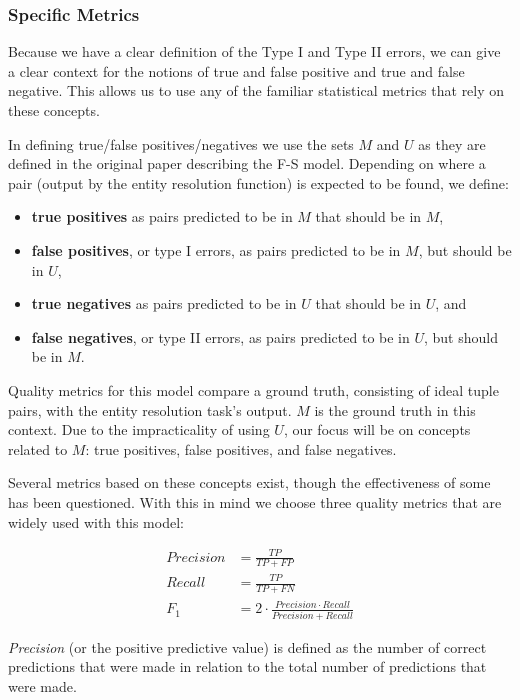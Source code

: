 \subsubsection[fsm-metrics]{Specific Metrics}\label{subsubsec:fsm-metrics}

Because we have a clear definition of the Type I and Type II errors, we can
give a clear context for the notions of true and false positive and true and
false negative.
This allows us to use any of the familiar statistical metrics that rely on
these concepts.

In defining true/false positives/negatives we use the sets $M$ and $U$ as
they are defined in the original paper describing the F-S model.
Depending on where a pair (output by the entity resolution function) is
expected to be found, we define:

\begin{itemize}
    \item \textbf{true positives} as pairs predicted to be in $M$ that
    should be in $M$,
    \item \textbf{false positives}, or type I errors, as pairs predicted to
    be in $M$, but should be in $U$,
    \item \textbf{true negatives} as pairs predicted to be in $U$ that
    should be in $U$, and
    \item \textbf{false negatives}, or type II errors, as pairs predicted to
    be in $U$, but should be in $M$.
\end{itemize}

Quality metrics for this model compare a ground truth, consisting of ideal
tuple pairs, with the entity resolution task's output.
$M$ is the ground truth in this context.
Due to the impracticality of using $U$, our focus will be on concepts
related to $M$: true positives, false positives, and false negatives.

Several metrics based on these concepts exist, though the effectiveness of
some has been questioned\cite{Goga2015}.
With this in mind we choose three quality metrics that are widely used with
this model:

\begin{align}
Precision &= \frac{TP}{TP+FP}\nonumber \\
Recall &= \frac{TP}{TP+FN}\nonumber \\
F_1 &=2 \cdot \frac{Precision \cdot Recall}{Precision+Recall}\nonumber
\end{align}

\textit{Precision} (or the positive predictive value) is defined as the
number of correct predictions that were made in relation to the total number
of predictions that were made.

